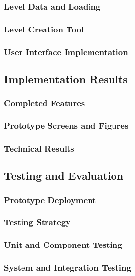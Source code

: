 \subsubsection{Level Data and Loading}
\subsubsection{Level Creation Tool}
\subsubsection{User Interface Implementation}

\subsection{Implementation Results}
\subsubsection{Completed Features}
\subsubsection{Prototype Screens and Figures}
\subsubsection{Technical Results}

\subsection{Testing and Evaluation}
\subsubsection{Prototype Deployment}
\subsubsection{Testing Strategy}
\subsubsection{Unit and Component Testing}
\subsubsection{System and Integration Testing}

